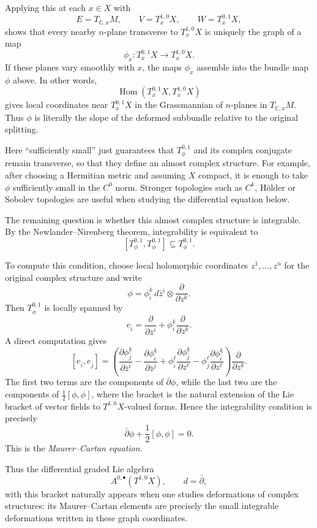 Applying this at each $x\in X$ with
$$
E=T_{\mathbb C,x}M,\qquad
V=T^{1,0}_xX,\qquad
W=T^{0,1}_xX,
$$
shows that every nearby $n$-plane transverse to
$T^{1,0}_xX$ is uniquely the graph of a map
$$
\phi_x:T^{0,1}_xX\longrightarrow T^{1,0}_xX.
$$
If these planes vary smoothly with $x$, the maps $\phi_x$
assemble into the bundle map $\phi$ above. In other words,
$$
\operatorname{Hom}(T^{0,1}_xX,T^{1,0}_xX)
$$
gives local coordinates near $T^{0,1}_xX$ in the
Grassmannian of $n$-planes in $T_{\mathbb C,x}M$. Thus
$\phi$ is literally the slope of the deformed subbundle
relative to the original splitting.

Here ``sufficiently small'' just guarantees that
$T^{0,1}_\phi$ and its complex conjugate remain
transverse, so that they define an almost complex
structure. For example, after choosing a Hermitian
metric and assuming $X$ compact, it is enough to take
$\phi$ sufficiently small in the $C^0$ norm. Stronger
topologies such as $C^k$, H\"older or Sobolev topologies
are useful when studying the differential equation below.

The remaining question is whether this almost complex
structure is integrable. By the Newlander--Nirenberg
theorem, integrability is equivalent to
$$
[T^{0,1}_\phi,T^{0,1}_\phi]
\subseteq T^{0,1}_\phi.
$$

To compute this condition, choose local holomorphic
coordinates $z^1,\ldots,z^n$ for the original complex
structure and write
$$
\phi=
\phi^k_{\bar i}\,d\bar z^i\otimes
\frac{\partial}{\partial z^k}.
$$
Then $T^{0,1}_\phi$ is locally spanned by
$$
e_{\bar i}
=\frac{\partial}{\partial\bar z^i}
+\phi^k_{\bar i}\frac{\partial}{\partial z^k}.
$$
A direct computation gives
$$
[e_{\bar i},e_{\bar j}]
=
\left(
\frac{\partial\phi^k_{\bar j}}{\partial\bar z^i}
-\frac{\partial\phi^k_{\bar i}}{\partial\bar z^j}
+\phi^\ell_{\bar i}
\frac{\partial\phi^k_{\bar j}}{\partial z^\ell}
-\phi^\ell_{\bar j}
\frac{\partial\phi^k_{\bar i}}{\partial z^\ell}
\right)
\frac{\partial}{\partial z^k}.
$$
The first two terms are the components of
$\bar\partial\phi$, while the last two are the
components of $\frac12[\phi,\phi]$, where the bracket
is the natural extension of the Lie bracket of vector
fields to $T^{1,0}X$-valued forms. Hence the
integrability condition is precisely
$$
\boxed{
\bar\partial\phi+\frac12[\phi,\phi]=0.
}
$$
This is the \emph{Maurer--Cartan equation}.

Thus the differential graded Lie algebra
$$
A^{0,\bullet}(T^{1,0}X),
\qquad d=\bar\partial,
$$
with this bracket naturally appears when one studies
deformations of complex structures: its
Maurer--Cartan elements are precisely the small
integrable deformations written in these graph
coordinates.


